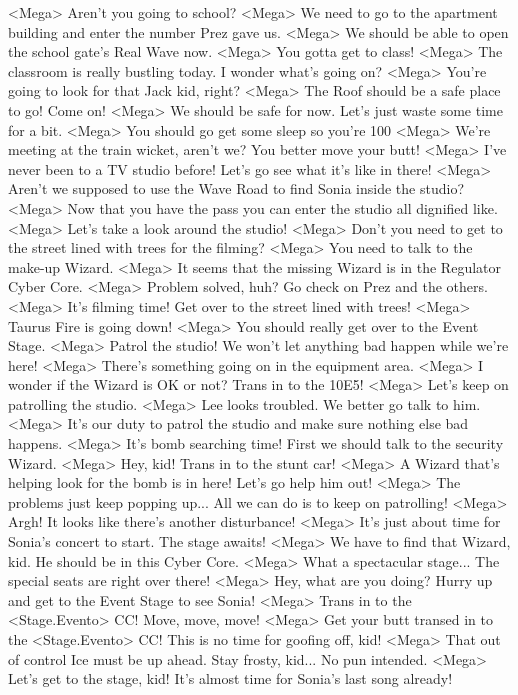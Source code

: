 <Mega> Aren't you going to school? 
<Mega> We need to go to the apartment building and enter the number Prez gave us. 
<Mega> We should be able to open the school gate's Real Wave now. 
<Mega> You gotta get to class! 
<Mega> The classroom is really bustling today. I wonder what's going on? 
<Mega> You're going to look for that Jack kid, right? 
<Mega> The Roof should be a safe place to go! Come on! 
<Mega> We should be safe for now. Let's just waste some time for a bit. 
<Mega> You should go get some sleep so you're 100%
<Mega> We're meeting at the train wicket, aren't we? You better move your butt! 
<Mega> I've never been to a TV studio before! Let's go see what it's like in there! 
<Mega> Aren't we supposed to use the Wave Road to find Sonia inside the studio? 
<Mega> Now that you have the pass you can enter the studio all dignified like. 
<Mega> Let's take a look around the studio! 
<Mega> Don't you need to get to the street lined with trees for the filming? 
<Mega> You need to talk to the make-up Wizard. 
<Mega> It seems that the missing Wizard is in the Regulator Cyber Core. 
<Mega> Problem solved, huh? Go check on Prez and the others. 
<Mega> It's filming time! Get over to the street lined with trees! 
<Mega> Taurus Fire is going down! 
<Mega> You should really get over to the Event Stage. 
<Mega> Patrol the studio! We won't let anything bad happen while we're here! 
<Mega> There's something going on in the equipment area. 
<Mega> I wonder if the Wizard is OK or not? Trans in to the {10}{E5}! 
<Mega> Let's keep on patrolling the studio. 
<Mega> Lee looks troubled. We better go talk to him. 
<Mega> It's our duty to patrol the studio and make sure nothing else bad happens. 
<Mega> It's bomb searching time! First we should talk to the security Wizard. 
<Mega> Hey, kid! Trans in to the stunt car! 
<Mega> A Wizard that's helping look for the bomb is in here! Let's go help him out! 
<Mega> The problems just keep popping up... All we can do is to keep on patrolling! 
<Mega> Argh! It looks like there's another disturbance! 
<Mega> It's just about time for Sonia's concert to start. The stage awaits! 
<Mega> We have to find that Wizard, kid. He should be in this Cyber Core. 
<Mega> What a spectacular stage... The special seats are right over there! 
<Mega> Hey, what are you doing? Hurry up and get to the Event Stage to see Sonia! 
<Mega> Trans in to the <Stage.Evento> CC! Move, move, move! 
<Mega> Get your butt transed in to the <Stage.Evento> CC! This is no time for goofing off, kid! 
<Mega> That out of control Ice must be up ahead. Stay frosty, kid... No pun intended. 
<Mega> Let's get to the stage, kid! It's almost time for Sonia's last song already! 
